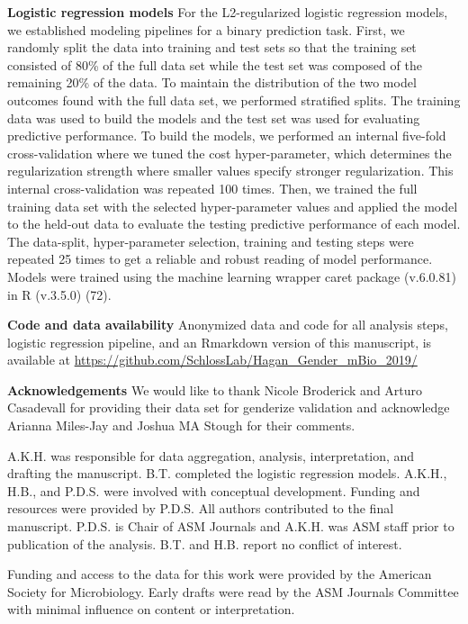 \documentclass[11pt,]{article}
\begin{document}
\textbf{Logistic regression models} For the L2-regularized logistic
regression models, we established modeling pipelines for a binary
prediction task. First, we randomly split the data into training and
test sets so that the training set consisted of 80\% of the full data
set while the test set was composed of the remaining 20\% of the data.
To maintain the distribution of the two model outcomes found with the
full data set, we performed stratified splits. The training data was
used to build the models and the test set was used for evaluating
predictive performance. To build the models, we performed an internal
five-fold cross-validation where we tuned the cost hyper-parameter,
which determines the regularization strength where smaller values
specify stronger regularization. This internal cross-validation was
repeated 100 times. Then, we trained the full training data set with the
selected hyper-parameter values and applied the model to the held-out
data to evaluate the testing predictive performance of each model. The
data-split, hyper-parameter selection, training and testing steps were
repeated 25 times to get a reliable and robust reading of model
performance. Models were trained using the machine learning wrapper
caret package (v.6.0.81) in R (v.3.5.0) (72).

\textbf{Code and data availability} Anonymized data and code for all
analysis steps, logistic regression pipeline, and an Rmarkdown version
of this manuscript, is available at
\url{https://github.com/SchlossLab/Hagan_Gender_mBio_2019/}

\textbf{Acknowledgements} We would like to thank Nicole Broderick and
Arturo Casadevall for providing their data set for genderize validation
and acknowledge Arianna Miles-Jay and Joshua MA Stough for their
comments.

A.K.H. was responsible for data aggregation, analysis, interpretation,
and drafting the manuscript. B.T. completed the logistic regression
models. A.K.H., H.B., and P.D.S. were involved with conceptual
development. Funding and resources were provided by P.D.S. All authors
contributed to the final manuscript. P.D.S. is Chair of ASM Journals and
A.K.H. was ASM staff prior to publication of the analysis. B.T. and H.B.
report no conflict of interest.

Funding and access to the data for this work were provided by the
American Society for Microbiology. Early drafts were read by the ASM
Journals Committee with minimal influence on content or interpretation.
\end{document}
